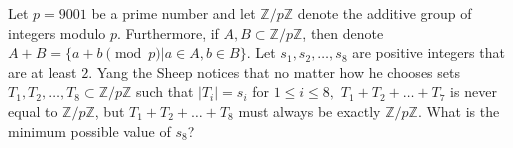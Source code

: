 Let $p = 9001$ be a prime number and let $\mathbb{Z}/p\mathbb{Z}$ denote the additive group of integers modulo $p$.  Furthermore, if $A, B \subset \mathbb{Z}/p\mathbb{Z}$, then denote $A+B = \{a+b \pmod{p} | a \in A, b \in B \}.$ Let $s_1, s_2, \dots, s_8$ are positive integers that are at least $2$. Yang the Sheep notices that no matter how he chooses sets $T_1, T_2, \dots, T_8\subset \mathbb{Z}/p\mathbb{Z}$ such that $|T_i| = s_i$ for $1 \le i \le 8,$ $T_1+T_2+\dots + T_7$ is never equal to $\mathbb{Z}/p\mathbb{Z}$, but $T_1+T_2+\dots+T_8$ must always be exactly $\mathbb{Z}/p\mathbb{Z}$. What is the minimum possible value of $s_8$?
